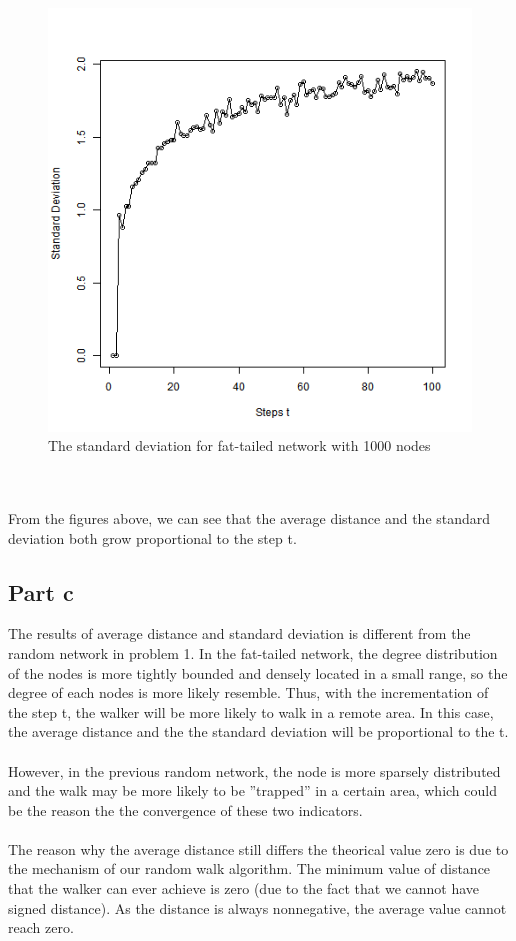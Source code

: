 \documentclass{article}
\begin{document}
\\
\begin{figure}[htbp]
\centering
\includegraphics[width=.6\textwidth]{Q2b_2.png}
\caption{The standard deviation for fat-tailed network with 1000 nodes}
\label{fig:p2_b2}
\end{figure}\\
\\
From the figures above, we can see that the average distance and the standard deviation both grow proportional to the step t.


\subsection{Part c}
The results of average distance and standard deviation is different from the random network in problem 1. In the fat-tailed network, the degree distribution of the nodes is more tightly bounded and densely located in a small range, so the degree of each nodes is more likely resemble. Thus, with the incrementation of the step t, the walker will be more likely to walk in a remote area. In this case, the average distance and the the standard deviation will be proportional to the t.\\
\\
However, in the previous random network, the node is more sparsely distributed and the walk may be more likely to be ”trapped” in a certain area, which could be the reason the the convergence of these two indicators.\\
\\
The reason why the average distance still differs the theorical value zero is due to the mechanism of our random walk algorithm. The minimum value of distance that the walker can ever achieve is zero (due to the fact that we cannot have signed distance). As the distance is always nonnegative, the average value cannot reach zero.\\
\end{document}
